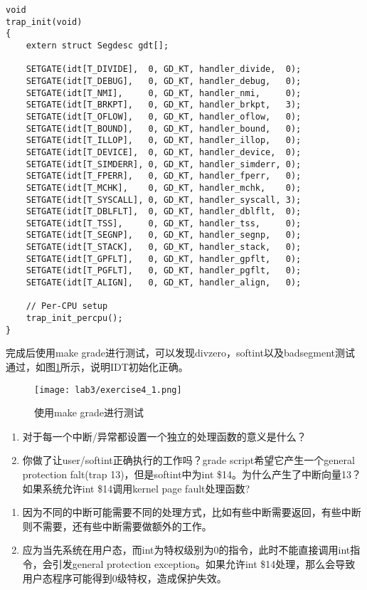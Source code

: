 \begin{exerciseSolution}{4}
\begin{lstlisting}
void
trap_init(void)
{
    extern struct Segdesc gdt[];

    SETGATE(idt[T_DIVIDE],  0, GD_KT, handler_divide,  0);
    SETGATE(idt[T_DEBUG],   0, GD_KT, handler_debug,   0);
    SETGATE(idt[T_NMI],     0, GD_KT, handler_nmi,     0);
    SETGATE(idt[T_BRKPT],   0, GD_KT, handler_brkpt,   3);
    SETGATE(idt[T_OFLOW],   0, GD_KT, handler_oflow,   0);
    SETGATE(idt[T_BOUND],   0, GD_KT, handler_bound,   0);
    SETGATE(idt[T_ILLOP],   0, GD_KT, handler_illop,   0);
    SETGATE(idt[T_DEVICE],  0, GD_KT, handler_device,  0);
    SETGATE(idt[T_SIMDERR], 0, GD_KT, handler_simderr, 0);
    SETGATE(idt[T_FPERR],   0, GD_KT, handler_fperr,   0);
    SETGATE(idt[T_MCHK],    0, GD_KT, handler_mchk,    0);
    SETGATE(idt[T_SYSCALL], 0, GD_KT, handler_syscall, 3);
    SETGATE(idt[T_DBLFLT],  0, GD_KT, handler_dblflt,  0);
    SETGATE(idt[T_TSS],     0, GD_KT, handler_tss,     0);
    SETGATE(idt[T_SEGNP],   0, GD_KT, handler_segnp,   0);
    SETGATE(idt[T_STACK],   0, GD_KT, handler_stack,   0);
    SETGATE(idt[T_GPFLT],   0, GD_KT, handler_gpflt,   0);
    SETGATE(idt[T_PGFLT],   0, GD_KT, handler_pgflt,   0);
    SETGATE(idt[T_ALIGN],   0, GD_KT, handler_align,   0);

    // Per-CPU setup
    trap_init_percpu();
}
\end{lstlisting}
\par 完成后使用make grade进行测试，可以发现divzero，softint以及badsegment测试通过，如图\ref{fig:lab3/exercise4_1}所示，说明IDT初始化正确。
\begin{figure}[htb]
    \centering
    \texttt{[image: lab3/exercise4\_1.png]}
    \caption{使用make grade进行测试}
    \label{fig:lab3/exercise4_1}
\end{figure}
\FloatBarrier
\end{exerciseSolution}

\begin{questionEnv}
    \begin{enumerate}
        \item 对于每一个中断/异常都设置一个独立的处理函数的意义是什么？
        \item 你做了让user/softint正确执行的工作吗？grade script希望它产生一个general protection falt(trap 13)，但是softint中为int \$14。为什么产生了中断向量13？如果系统允许int \$14调用kernel page fault处理函数?
    \end{enumerate}
\end{questionEnv}
\begin{answer}
    \begin{enumerate}
        \item 因为不同的中断可能需要不同的处理方式，比如有些中断需要返回，有些中断则不需要，还有些中断需要做额外的工作。
        \item 应为当先系统在用户态，而int为特权级别为0的指令，此时不能直接调用int指令，会引发general protection exception。如果允许int \$14处理，那么会导致用户态程序可能得到0级特权，造成保护失效。
    \end{enumerate}
\end{answer}


